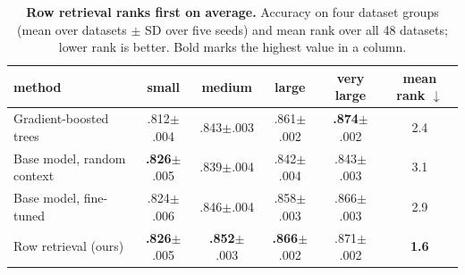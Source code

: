 \begin{table}[t]
\centering
\caption{\textbf{Row retrieval ranks first on average.} Accuracy on four dataset groups (mean over datasets $\pm$ SD over five seeds) and mean rank over all 48 datasets; lower rank is better. Bold marks the highest value in a column.}
\label{tab:results}
\small
\begin{tabular}{lccccc}
\toprule
method & small & medium & large & very large & mean rank $\downarrow$\\
\midrule
Gradient-boosted trees & .812{\scriptsize$\pm$.004} & .843{\scriptsize$\pm$.003} & .861{\scriptsize$\pm$.002} & \textbf{.874}{\scriptsize$\pm$.002} & 2.4\\
Base model, random context & \textbf{.826}{\scriptsize$\pm$.005} & .839{\scriptsize$\pm$.004} & .842{\scriptsize$\pm$.004} & .843{\scriptsize$\pm$.003} & 3.1\\
Base model, fine-tuned & .824{\scriptsize$\pm$.006} & .846{\scriptsize$\pm$.004} & .858{\scriptsize$\pm$.003} & .866{\scriptsize$\pm$.003} & 2.9\\
\midrule
Row retrieval (ours) & \textbf{.826}{\scriptsize$\pm$.005} & \textbf{.852}{\scriptsize$\pm$.003} & \textbf{.866}{\scriptsize$\pm$.002} & .871{\scriptsize$\pm$.002} & \textbf{1.6}\\
\bottomrule
\end{tabular}
\end{table}
